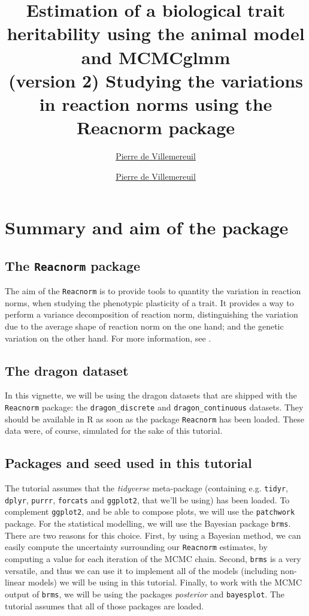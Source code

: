 \documentclass[a4paper,12pt,twoside]{article}
\title{
  \tcbox[colback=themecolor,colframe=themecolor]{\color{white}Tutorial} 
  Estimation of a biological trait heritability using the animal model and MCMCglmm\\
  \large{(version 2)}
}
\author[Pierre de Villemereuil]{\href{mailto:pierre.de-villemereuil@mnhn.fr}{Pierre de Villemereuil}}
\author{\href{mailto:pierre.de-villemereuil@mnhn.fr}{Pierre de Villemereuil}}
\title{Studying the variations in reaction norms using the Reacnorm package}
\begin{document}
\maketitle

\tableofcontents

\newpage

\section{Summary and aim of the package}

\subsection{The \texttt{Reacnorm} package}

The aim of the \texttt{Reacnorm} is to provide tools to quantity the variation in reaction norms, when studying the phenotypic plasticity of a trait. It provides a way to perform a variance decomposition of reaction norm, distinguishing the variation due to the average shape of reaction norm on the one hand; and the genetic variation on the other hand. For more information, see \textcite{devillemereuil_partitioning_2023}.

\subsection{The dragon dataset}

In this vignette, we will be using the dragon datasets that are shipped with the \texttt{Reacnorm} package: the \texttt{dragon\_discrete} and \texttt{dragon\_continuous} datasets. They should be available in R as soon as the package \texttt{Reacnorm} has been loaded.
These data were, of course, simulated for the sake of this tutorial.

\subsection{Packages and seed used in this tutorial}

The tutorial assumes that the \textit{tidyverse} meta-package (containing e.g. \texttt{tidyr}, \texttt{dplyr}, \texttt{purrr}, \texttt{forcats} and \texttt{ggplot2}, that we'll be using) has been loaded.
To complement \texttt{ggplot2}, and be able to compose plots, we will use the \texttt{patchwork} package. For the statistical modelling, we will use the Bayesian package \texttt{brms}. 
There are two reasons for this choice. First, by using a Bayesian method, we can easily compute the uncertainty surrounding our \texttt{Reacnorm} estimates, by computing a value for each iteration of the MCMC chain. Second, \texttt{brms} is a very versatile, and thus we can use it to implement all of the models (including non-linear models) we will be using in this tutorial.
Finally, to work with the MCMC output of \texttt{brms}, we will be using the packages \textit{posterior} and \texttt{bayesplot}.
The tutorial assumes that all of those packages are loaded.
\end{document}
